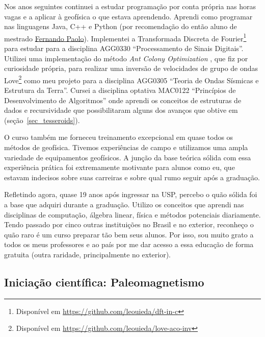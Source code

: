 \documentclass[10pt,a4paper,oneside]{book}
\begin{document}
Nos anos seguintes continuei a estudar programação por conta própria nas horas
vagas e a aplicar à geofísica o que estava aprendendo.
Aprendi como programar nas linguagens Java, C++ e Python (por recomendação do
então aluno de mestrado \href{https://www.linkedin.com/in/fspaolo/}{Fernando Paolo}).
Implementei a Transformada Discreta de Fourier\footnote{Disponível em
\url{https://github.com/leouieda/dft-in-c}} para estudar para a disciplina
AGG0330 ``Processamento de Sinais Digitais''.
Utilizei uma implementação do método \textit{Ant Colony Optimization}
\citep{Socha2008}, que fiz por curiosidade própria, para realizar uma inversão
de velocidades de grupo de ondas
Love\footnote{Disponível em \url{https://github.com/leouieda/love-aco-inv}}
como meu projeto para a disciplina AGG0305 ``Teoria de Ondas Sísmicas e
Estrutura da Terra''.
Cursei a disciplina optativa MAC0122 ``Princípios de Desenvolvimento de
Algoritmos'' onde aprendi os conceitos de estruturas de dados e recursividade
que possibilitaram alguns dos avanços que obtive em \citet{Uieda2016}
(seção~\ref{sec_tesseroids}).

O curso também me forneceu treinamento excepcional em quase todos os métodos de
geofísica.
Tivemos experiências de campo e utilizamos uma ampla variedade de equipamentos
geofísicos.
A junção da base teórica sólida com essa experiência prática foi
extremamente motivante para alunos como eu, que estavam indecisos sobre suas
carreiras e sobre qual rumo seguir após a graduação.

Refletindo agora, quase 19 anos após ingressar na USP, percebo o quão sólida
foi a base que adquiri durante a graduação. Utilizo os conceitos que aprendi
nas disciplinas de computação, álgebra linear, física e métodos potenciais
diariamente. Tendo passado por cinco outras instituições no Brasil e no
exterior, reconheço o quão raro é um curso preparar tão bem seus alunos.
Por isso, sou muito grato a todos os meus professores e ao país por me dar
acesso a essa educação de forma gratuita (outra raridade, principalmente no
exterior).

\subsection{Iniciação científica: Paleomagnetismo}
\label{sec_ic_paleomag}
\end{document}
